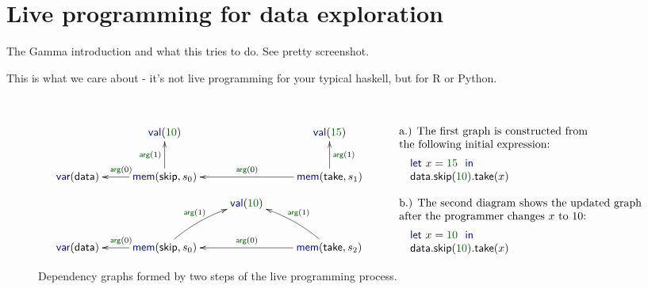 \documentclass[sigplan,10pt]{acmart}\settopmatter{printfolios=true,printccs=false,printacmref=false}
\newcommand{\num}[1]{\textcolor{numclr}{#1}}
\newcommand{\ident}[1]{\textnormal{\sffamily #1}}
\newcommand{\kvd}[1]{\textnormal{\textcolor{kvdclr}{\sffamily #1}}}
\newcommand{\bnd}[1]{\textnormal{\textcolor{kvdclr}{\sffamily #1}}}
\newcommand{\blbl}[1]{\textnormal{\textcolor{numclr}{\sffamily #1}}}
\begin{document}
\newpage


\section{Live programming for data exploration}

The Gamma introduction and what this tries to do. See pretty screenshot.

This is what we care about - it's not live programming for your typical haskell,
but for R or Python.

\newpage
~


\begin{figure}
\begin{equation*}
\begin{array}{l}
\xymatrix{
& \bnd{val}(\num{10}) &\qquad\quad& \bnd{val}(\num{15})\\
\bnd{var}(\ident{data}) & 
  \bnd{mem}(\ident{skip},s_0)\ar[l]_{\blbl{arg}(0)} \ar[u]^{\blbl{arg}(1)} && 
  \bnd{mem}(\ident{take},s_1)\ar[ll]_{\blbl{arg}(0)} \ar[u]_{\blbl{arg}(1)}
}\\[5em]
\xymatrix{
&& \bnd{val}(\num{10})\\
\bnd{var}(\ident{data}) & 
  \bnd{mem}(\ident{skip}, s_0)\ar[l]_{\blbl{arg}(0)} \ar@/^/[ru]^{\blbl{arg}(1)} && 
  \bnd{mem}(\ident{take}, s_2)\ar[ll]_{\blbl{arg}(0)} \ar@/_/[lu]_{\blbl{arg}(1)}
}
\end{array}\qquad
\begin{array}{l}
\textnormal{a.) The first graph is constructed from}\\
\textnormal{the following initial expression:}\\[0.5em]
\quad\kvd{let}~x = \num{15}~\kvd{in}\\
\quad\ident{data.skip}(\num{10}).\ident{take}(x)\\
\\
\textnormal{b.) The second diagram shows the updated graph}\\
\textnormal{after the programmer changes $x$ to $10$:}\\[0.5em]
\quad\kvd{let}~x = \num{10}~\kvd{in}\\
\quad\ident{data.skip}(\num{10}).\ident{take}(x)
\end{array}
\end{equation*}
\caption{Dependency graphs formed by two steps of the live programming process. }
\label{fig:dep-graph}
\end{figure}
\end{document}
